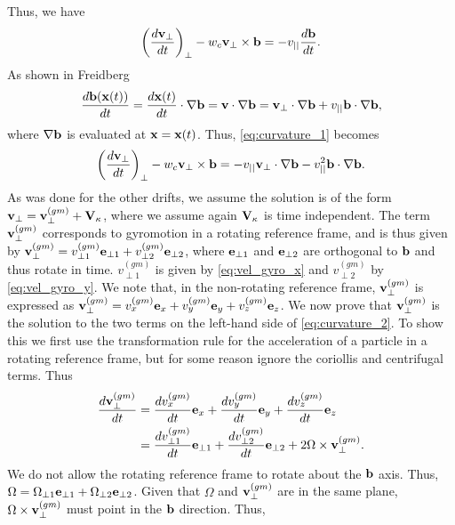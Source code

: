 \documentclass[oneside,a4paper,11pt]{report}
\begin{document}
Thus, we have
\begin{equation}
\label{eq:curvature_1}
    \left ( \frac{ d \mathbf{v}_\perp}{dt} \right)_\perp - w_c \mathbf{v}_\perp \times \mathbf{b} = -v_{||} \frac{d\mathbf{b}}{dt}.
\end{equation}
As shown in Freidberg
\begin{equation}
    \frac{d \mathbf{b}(\mathbf{x}(t))}{dt} = \frac{d \mathbf{x}(t)}{dt} \cdot \nabla \mathbf{b} = \mathbf{v} \cdot \nabla \mathbf{b} = \mathbf{v}_\perp \cdot \nabla \mathbf{b} + v_{||} \mathbf{b} \cdot \nabla \mathbf{b},
\end{equation}
where $\nabla \mathbf{b}$ is evaluated at $\mathbf{x} = \mathbf{x}(t)$. Thus, \cref{eq:curvature_1} becomes
\begin{equation}
\label{eq:curvature_2}
    \left ( \frac{ d \mathbf{v}_\perp}{dt} \right)_\perp - w_c \mathbf{v}_\perp \times \mathbf{b} = -v_{||} \mathbf{v}_\perp \cdot \nabla \mathbf{b} - v_{||}^2 \mathbf{b} \cdot \nabla \mathbf{b}.
\end{equation}
As was done for the other drifts, we assume the solution is of the form $\mathbf{v}_\perp = \mathbf{v}_\perp^{(gm)} + \mathbf{V}_\kappa$, where we assume again $\mathbf{V}_\kappa$ is time independent. The term $\mathbf{v}_\perp^{(gm)}$ corresponds to gyromotion in a rotating reference frame, and is thus given by $\mathbf{v}_\perp^{(gm)} = v^{(gm)}_{\perp1} \mathbf{e}_{\perp1} + v^{(gm)}_{\perp2} \mathbf{e}_{\perp2}$, where $\mathbf{e}_{\perp1}$ and $\mathbf{e}_{\perp2}$ are orthogonal to $\mathbf{b}$ and thus rotate in time. $v^{(gm)}_{\perp1}$ is given by \cref{eq:vel_gyro_x} and $v^{(gm)}_{\perp2}$ by \cref{eq:vel_gyro_y}. We note that, in the non-rotating reference frame, $\mathbf{v}_\perp^{(gm)}$ is expressed as $\mathbf{v}_\perp^{(gm)} = v^{(gm)}_x \mathbf{e}_x + v^{(gm)}_y \mathbf{e}_y + v^{(gm)}_z \mathbf{e}_z$. We now prove that $\mathbf{v}_\perp^{(gm)}$ is the solution to the two terms on the left-hand side of \cref{eq:curvature_2}. To show this we first use the transformation rule for the acceleration of a particle in a rotating reference frame, but for some reason ignore the coriollis and centrifugal terms. Thus
\begin{align}
    \frac{d \mathbf{v}_\perp^{(gm)}}{dt} &= \frac{dv^{(gm)}_x}{dt} \mathbf{e}_x + \frac{dv^{(gm)}_y}{dt} \mathbf{e}_y + \frac{dv^{(gm)}_z}{dt} \mathbf{e}_z \nonumber \\ &= \frac{dv^{(gm)}_{\perp1}}{dt} \mathbf{e}_{\perp1} + \frac{dv^{(gm)}_{\perp2}}{dt} \mathbf{e}_{\perp2} + 2\Omega \times \mathbf{v}_\perp^{(gm)}.
\end{align}
We do not allow the rotating reference frame to rotate about the $\mathbf{b}$ axis. Thus, $\Omega = \Omega_{\perp1} \mathbf{e}_{\perp1} + \Omega_{\perp2} \mathbf{e}_{\perp2}$. Given that $\Omega$ and $\mathbf{v}_\perp^{(gm)}$ are in the same plane, $\Omega \times \mathbf{v}_\perp^{(gm)}$ must point in the $\mathbf{b}$ direction. Thus, 
\end{document}
